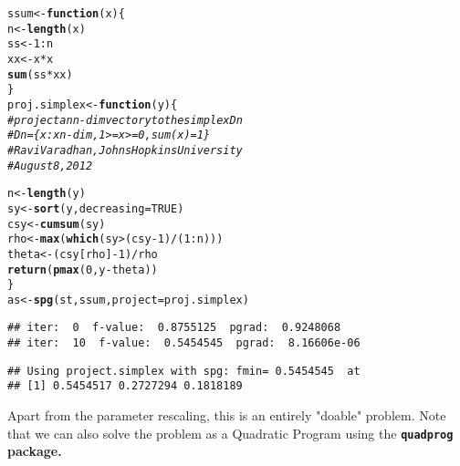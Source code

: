\documentclass[11pt]{article}\usepackage[]{graphicx}\usepackage[]{color}
\makeatletter
\newcommand{\hlnum}[1]{\textcolor[rgb]{0.686,0.059,0.569}{#1}}%
\newcommand{\hlcom}[1]{\textcolor[rgb]{0.678,0.584,0.686}{\textit{#1}}}%
\newcommand{\hlopt}[1]{\textcolor[rgb]{0,0,0}{#1}}%
\newcommand{\hlstd}[1]{\textcolor[rgb]{0.345,0.345,0.345}{#1}}%
\newcommand{\hlkwa}[1]{\textcolor[rgb]{0.161,0.373,0.58}{\textbf{#1}}}%
\newcommand{\hlkwb}[1]{\textcolor[rgb]{0.69,0.353,0.396}{#1}}%
\newcommand{\hlkwc}[1]{\textcolor[rgb]{0.333,0.667,0.333}{#1}}%
\newcommand{\hlkwd}[1]{\textcolor[rgb]{0.737,0.353,0.396}{\textbf{#1}}}%
\newenvironment{kframe}{%
 \def\at@end@of@kframe{}%
 \ifinner\ifhmode%
  \def\at@end@of@kframe{\end{minipage}}%
  \begin{minipage}{\columnwidth}%
 \fi\fi%
 \def\FrameCommand##1{\hskip\@totalleftmargin \hskip-\fboxsep
 \colorbox{shadecolor}{##1}\hskip-\fboxsep
     \hskip-\linewidth \hskip-\@totalleftmargin \hskip\columnwidth}%
 \MakeFramed {\advance\hsize-\width
   \@totalleftmargin\z@ \linewidth\hsize
   \@setminipage}}%
 {\par\unskip\endMakeFramed%
 \at@end@of@kframe}
\newenvironment{knitrout}{}{} %
\newcommand{\pkg}[1]{\bf{\tt#1}\rm }
\makeatother
\begin{document}
\begin{knitrout}\scriptsize
{}\color{fgcolor}\begin{kframe}
\begin{alltt}
\hlstd{ssum}\hlkwb{<-}\hlkwa{function}\hlstd{(}\hlkwc{x}\hlstd{)\{}
  \hlstd{n}\hlkwb{<-}\hlkwd{length}\hlstd{(x)}
  \hlstd{ss}\hlkwb{<-}\hlnum{1}\hlopt{:}\hlstd{n}
  \hlstd{xx}\hlkwb{<-}\hlstd{x}\hlopt{*}\hlstd{x}
  \hlkwd{sum}\hlstd{(ss}\hlopt{*}\hlstd{xx)}
\hlstd{\}}
\hlstd{proj.simplex} \hlkwb{<-} \hlkwa{function}\hlstd{(}\hlkwc{y}\hlstd{) \{}
\hlcom{# project an n-dim vector y to the simplex Dn}
\hlcom{# Dn = \{ x : x n-dim, 1 >= x >= 0, sum(x) = 1\}}
\hlcom{# Ravi Varadhan, Johns Hopkins University}
\hlcom{# August 8, 2012}

\hlstd{n} \hlkwb{<-} \hlkwd{length}\hlstd{(y)}
\hlstd{sy} \hlkwb{<-} \hlkwd{sort}\hlstd{(y,} \hlkwc{decreasing}\hlstd{=}\hlnum{TRUE}\hlstd{)}
\hlstd{csy} \hlkwb{<-} \hlkwd{cumsum}\hlstd{(sy)}
\hlstd{rho} \hlkwb{<-} \hlkwd{max}\hlstd{(}\hlkwd{which}\hlstd{(sy} \hlopt{>} \hlstd{(csy} \hlopt{-} \hlnum{1}\hlstd{)}\hlopt{/}\hlstd{(}\hlnum{1}\hlopt{:}\hlstd{n)))}
\hlstd{theta} \hlkwb{<-} \hlstd{(csy[rho]} \hlopt{-} \hlnum{1}\hlstd{)} \hlopt{/} \hlstd{rho}
\hlkwd{return}\hlstd{(}\hlkwd{pmax}\hlstd{(}\hlnum{0}\hlstd{, y} \hlopt{-} \hlstd{theta))}
\hlstd{\}}
\hlstd{as}\hlkwb{<-}\hlkwd{spg}\hlstd{(st, ssum,} \hlkwc{project}\hlstd{=proj.simplex)}
\end{alltt}
\begin{verbatim}
## iter:  0  f-value:  0.8755125  pgrad:  0.9248068 
## iter:  10  f-value:  0.5454545  pgrad:  8.16606e-06
\end{verbatim}
\end{kframe}
\end{knitrout}
\begin{knitrout}\scriptsize
{}\color{fgcolor}\begin{kframe}
\begin{verbatim}
## Using project.simplex with spg: fmin= 0.5454545  at
## [1] 0.5454517 0.2727294 0.1818189
\end{verbatim}
\end{kframe}
\end{knitrout}

Apart from the parameter rescaling, this is an entirely "doable" problem. 
Note that we can also solve the problem as a Quadratic Program using
the \pkg{quadprog} package.
\end{document}
